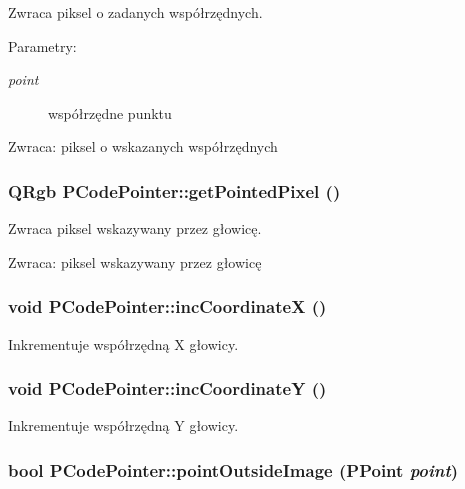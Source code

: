 Zwraca piksel o zadanych współrzędnych. \begin{Desc}
\item[Parametry:]
\begin{description}
\item[{\em point}]współrzędne punktu \end{description}
\end{Desc}
\begin{Desc}
\item[Zwraca:]piksel o wskazanych współrzędnych \end{Desc}
\hypertarget{classPCodePointer_6544ee43112dcafb5fc7c865ced682f0}{
\subsubsection[{getPointedPixel}]{\setlength{\rightskip}{0pt plus 5cm}QRgb PCodePointer::getPointedPixel ()}}
\label{classPCodePointer_6544ee43112dcafb5fc7c865ced682f0}


Zwraca piksel wskazywany przez głowicę. \begin{Desc}
\item[Zwraca:]piksel wskazywany przez głowicę \end{Desc}
\hypertarget{classPCodePointer_ef8324dbdca82baa094e47e36f978669}{
\subsubsection[{incCoordinateX}]{\setlength{\rightskip}{0pt plus 5cm}void PCodePointer::incCoordinateX ()}}
\label{classPCodePointer_ef8324dbdca82baa094e47e36f978669}


Inkrementuje współrzędną X głowicy. \hypertarget{classPCodePointer_58c15d4d1abb1fb971170f19c3b9e8cf}{
\subsubsection[{incCoordinateY}]{\setlength{\rightskip}{0pt plus 5cm}void PCodePointer::incCoordinateY ()}}
\label{classPCodePointer_58c15d4d1abb1fb971170f19c3b9e8cf}


Inkrementuje współrzędną Y głowicy. \hypertarget{classPCodePointer_a9e836354b61f96ed39208c8b37d57d3}{
\subsubsection[{pointOutsideImage}]{\setlength{\rightskip}{0pt plus 5cm}bool PCodePointer::pointOutsideImage ({\bf PPoint} {\em point})}}
\label{classPCodePointer_a9e836354b61f96ed39208c8b37d57d3}



